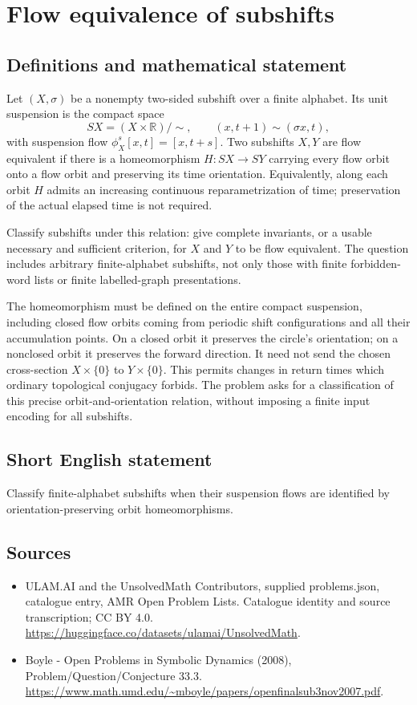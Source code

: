 \documentclass[11pt,a4paper]{article}
\begin{document}
\section*{Flow equivalence of subshifts}\label{statement}

\subsection{Definitions and mathematical statement}
Let $(X,\sigma)$ be a nonempty two-sided subshift over a
finite alphabet. Its unit suspension is the compact space
\[
 SX=(X\times\mathbb R)/\!\sim,\qquad
        (x,t+1)\sim(\sigma x,t),
\]
with suspension flow $\phi_X^s[x,t]=[x,t+s]$.
Two subshifts $X,Y$ are flow equivalent if there is a
homeomorphism $H:SX\to SY$ carrying every flow orbit
onto a flow orbit and preserving its time orientation.
Equivalently, along each orbit $H$ admits an increasing
continuous reparametrization of time; preservation of the
actual elapsed time is not required.

Classify subshifts under this relation: give complete
invariants, or a usable necessary and sufficient criterion,
for $X$ and $Y$ to be flow equivalent. The question
includes arbitrary finite-alphabet subshifts, not only those
with finite forbidden-word lists or finite labelled-graph
presentations.

The homeomorphism must be defined on the entire compact
suspension, including closed flow orbits coming from periodic
shift configurations and all their accumulation points.
On a closed orbit it preserves the circle's orientation;
on a nonclosed orbit it preserves the forward direction.
It need not send the chosen cross-section $X\times\{0\}$
to $Y\times\{0\}$. This permits changes in return times
which ordinary topological conjugacy forbids. The problem
asks for a classification of this precise orbit-and-orientation
relation, without imposing a finite input encoding for
all subshifts.
\subsection{Short English statement}
Classify finite-alphabet subshifts when their suspension flows are identified by orientation-preserving orbit homeomorphisms.
\subsection{Sources}
\begin{itemize}
\item[S1] ULAM.AI and the UnsolvedMath Contributors, supplied problems.json, catalogue entry, AMR Open Problem Lists. Catalogue identity and source transcription; CC BY 4.0.
\url{https://huggingface.co/datasets/ulamai/UnsolvedMath}.
\item[S2] Boyle - Open Problems in Symbolic Dynamics (2008), Problem/Question/Conjecture 33.3. 
\url{https://www.math.umd.edu/~mboyle/papers/openfinalsub3nov2007.pdf}.
\end{itemize}
\end{document}
